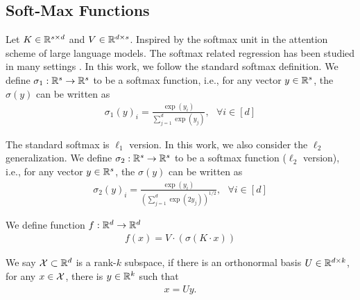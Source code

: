 \subsection{Soft-Max Functions}\label{sec:soft_max_func}


Let $K \in \mathbb{R}^{s \times d}$ and $V \in \mathbb{R}^{d \times s}$.
Inspired by the softmax unit in the attention scheme of large language models. The softmax related regression has been studied in many settings \cite{zhdk23,as23,bsz23,lsz23,dms23,dls23,gms23,lsx+23,gsy23_dp}. In this work, we follow the standard softmax definition. 
We define $\sigma_1 : \mathbb{R}^s \rightarrow \mathbb{R}^s$ to be a softmax function, i.e., for any vector $y \in \mathbb{R}^s$, the $\sigma(y)$ can be written as
\begin{align*}
\sigma_1( y )_i =  \frac{ \exp(y_i) }{ \sum_{j=1}^d \exp(y_j) } , ~~~ \forall i \in [d]
\end{align*}

The standard softmax is $\ell_1$ version. In this work, we also consider the $\ell_2$ generalization. 
We define $\sigma_2: \mathbb{R}^s \rightarrow \mathbb{R}^s$ to be  a softmax function ($\ell_2$ version), i.e., for any vector $y \in \mathbb{R}^s$, the $\sigma(y)$ can be written as
\begin{align*}
\sigma_2( y )_i =  \frac{ \exp( y_i) }{ ( \sum_{j=1}^d \exp(2 y_j) )^{1/2} } , ~~~ \forall i \in [d]
\end{align*}


We define function $f : \mathbb{R}^d \rightarrow \mathbb{R}^d$
\begin{align}\label{eq:f_x}
f (x) =  V \cdot ( \sigma (K \cdot x) ) 
\end{align}

\begin{definition}
We say ${\cal X} \subset \mathbb{R}^d$ is a rank-$k$ subspace, if there is an orthonormal basis $U \in \mathbb{R}^{d \times k}$, for any $x \in {\cal X}$, there is $ y \in \mathbb{R}^k$ such that
\begin{align*}
x = U y.
\end{align*}
\end{definition}

